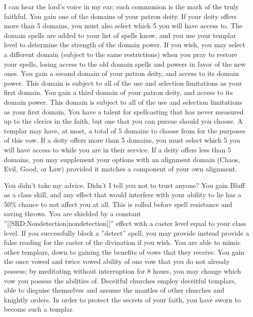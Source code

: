 \begin{optional}
{I can hear the lord's voice in my ear; such communion is the mark of the truly faithful.}
{You gain one of the domains of your patron deity. If your deity offers more than 5 domains, you must also select which 5 you will have access to. The domain spells are added to your list of spells know, and you use your templar level to determine the strength of the domain power. If you wish, you may select a different domain (subject to the same restrictions) when you pray to restore your spells, losing access to the old domain spells and powers in favor of the new ones.}
{You gain a second domain of your patron deity, and access to its domain power. This domain is subject to all of the use and selection limitations as your first domain.}
{You gain a third domain of your patron deity, and access to its domain power. This domain is subject to all of the use and selection limitations as your first domain.}
{You have a talent for spellcasting that has never measured up to the clerics in the faith, but one that you can pursue should you choose.}
{A templar may have, at most, a total of 5 domains to choose from for the purposes of this vow. If a deity offers more than 5 domains, you must select which 5 you will have access to while you are in their service. If a deity offers less than 5 domains, you may supplement your options with an alignment domain (Chaos, Evil, Good, or Law) provided it matches a component of your own alignment.}

{You didn't take my advice. Didn't I tell you not to trust anyone?
}{You gain Bluff as a class skill, and any effect that would interfere with your ability to lie has a 50\% chance to not affect you at all. This is rolled before spell resistance and saving throws.}
{You are shielded by a constant ''[[SRD:Nondetection|nondetection]]'' effect with a caster level equal to your class level. If you successfully block a ''detect'' spell, you may provide instead provide a false reading for the caster of the divination if you wish.}
{You are able to mimic other templars, down to gaining the benefits of vows that they receive. You gain the once vowed and twice vowed ability of one vow that you do not already possess; by meditating without interruption for 8 hours, you may change which vow you possess the abilities of.}
{Deceitful churches employ deceitful templars, able to disguise themselves and assume the mantles of other churches and knightly orders. In order to protect the secrets of your faith, you have sworn to become such a templar.}


\end{optional}
